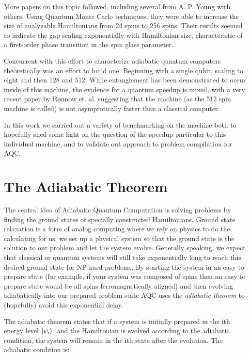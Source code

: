 More papers on this topic followed, including several from A. P. Young with others.\cite{young3}\cite{young2}\cite{young1}  Using Quantum Monte Carlo techniques, they were able to increase the size of analyzable Hamiltonians from 24 spins to 256 spins.  \cite{young1}
Their results seemed to indicate the gap scaling exponentially with Hamiltonian size, characteristic of a first-order phase transition in the spin glass parameter.\cite{young2}

Concurrent with this effort to characterize adiabatic quantum computers theoretically was an effort to build one.  Beginning with a single qubit\cite{qubit}, scaling to eight\cite{PhysRevB.82.024511} and then 128\cite{boixo2} and 512.\cite{pudenz}  While entanglement has been demonstrated to occur inside of this machine\cite{lanting}, the evidence for a quantum speedup is mixed,\cite{pudenz}\cite{boixo}\cite{smolin} with a very recent paper by R{\o}nnow et. al. suggesting that the \machine machine (as the 512 spin machine is called) is not asymptotically faster than a classical computer.

In this work we carried out a variety of benchmarking on the \machine machine both to hopefully shed some light on the question of the speedup particular to this individual machine, and to validate out approach to problem compilation for AQC.

\section{The Adiabatic Theorem}

The central idea of Adiabatic Quantum Computation is solving problems by finding the ground states of specially constructed Hamiltonians.\cite{farhi}  Ground state relaxation is a form of analog computing where we rely on physics to do the calculating for us: we set up a physical system so that the ground state is the solution to our problem and let the system evolve.  Generally speaking, we expect that classical or quantum systems will still take exponentially long to reach this desired ground state for NP-hard problems.\cite{aaronson}
By starting the system in an easy to prepare state (for example, if your system was composed of spins then an easy to prepare state would be all spins ferromagnetically aligned) and then evolving adiabatically into our prepared problem state AQC uses the \emph{adiabatic theorem} to (hopefully) avoid this exponential delay.

The adiabatic theorem states that if a system is initially prepared in the ith energy level $\mathinner{|{\psi_i}\rangle}$, and the Hamiltonian is evolved according to the adiabatic condition, the system will remain in the ith state after the evolution.  The adiabatic condition is:

